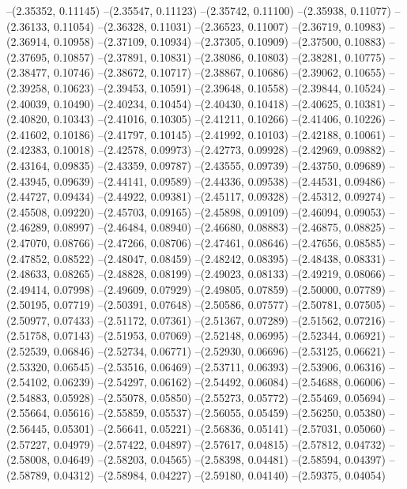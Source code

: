 --(2.35352, 0.11145)
--(2.35547, 0.11123)
--(2.35742, 0.11100)
--(2.35938, 0.11077)
--(2.36133, 0.11054)
--(2.36328, 0.11031)
--(2.36523, 0.11007)
--(2.36719, 0.10983)
--(2.36914, 0.10958)
--(2.37109, 0.10934)
--(2.37305, 0.10909)
--(2.37500, 0.10883)
--(2.37695, 0.10857)
--(2.37891, 0.10831)
--(2.38086, 0.10803)
--(2.38281, 0.10775)
--(2.38477, 0.10746)
--(2.38672, 0.10717)
--(2.38867, 0.10686)
--(2.39062, 0.10655)
--(2.39258, 0.10623)
--(2.39453, 0.10591)
--(2.39648, 0.10558)
--(2.39844, 0.10524)
--(2.40039, 0.10490)
--(2.40234, 0.10454)
--(2.40430, 0.10418)
--(2.40625, 0.10381)
--(2.40820, 0.10343)
--(2.41016, 0.10305)
--(2.41211, 0.10266)
--(2.41406, 0.10226)
--(2.41602, 0.10186)
--(2.41797, 0.10145)
--(2.41992, 0.10103)
--(2.42188, 0.10061)
--(2.42383, 0.10018)
--(2.42578, 0.09973)
--(2.42773, 0.09928)
--(2.42969, 0.09882)
--(2.43164, 0.09835)
--(2.43359, 0.09787)
--(2.43555, 0.09739)
--(2.43750, 0.09689)
--(2.43945, 0.09639)
--(2.44141, 0.09589)
--(2.44336, 0.09538)
--(2.44531, 0.09486)
--(2.44727, 0.09434)
--(2.44922, 0.09381)
--(2.45117, 0.09328)
--(2.45312, 0.09274)
--(2.45508, 0.09220)
--(2.45703, 0.09165)
--(2.45898, 0.09109)
--(2.46094, 0.09053)
--(2.46289, 0.08997)
--(2.46484, 0.08940)
--(2.46680, 0.08883)
--(2.46875, 0.08825)
--(2.47070, 0.08766)
--(2.47266, 0.08706)
--(2.47461, 0.08646)
--(2.47656, 0.08585)
--(2.47852, 0.08522)
--(2.48047, 0.08459)
--(2.48242, 0.08395)
--(2.48438, 0.08331)
--(2.48633, 0.08265)
--(2.48828, 0.08199)
--(2.49023, 0.08133)
--(2.49219, 0.08066)
--(2.49414, 0.07998)
--(2.49609, 0.07929)
--(2.49805, 0.07859)
--(2.50000, 0.07789)
--(2.50195, 0.07719)
--(2.50391, 0.07648)
--(2.50586, 0.07577)
--(2.50781, 0.07505)
--(2.50977, 0.07433)
--(2.51172, 0.07361)
--(2.51367, 0.07289)
--(2.51562, 0.07216)
--(2.51758, 0.07143)
--(2.51953, 0.07069)
--(2.52148, 0.06995)
--(2.52344, 0.06921)
--(2.52539, 0.06846)
--(2.52734, 0.06771)
--(2.52930, 0.06696)
--(2.53125, 0.06621)
--(2.53320, 0.06545)
--(2.53516, 0.06469)
--(2.53711, 0.06393)
--(2.53906, 0.06316)
--(2.54102, 0.06239)
--(2.54297, 0.06162)
--(2.54492, 0.06084)
--(2.54688, 0.06006)
--(2.54883, 0.05928)
--(2.55078, 0.05850)
--(2.55273, 0.05772)
--(2.55469, 0.05694)
--(2.55664, 0.05616)
--(2.55859, 0.05537)
--(2.56055, 0.05459)
--(2.56250, 0.05380)
--(2.56445, 0.05301)
--(2.56641, 0.05221)
--(2.56836, 0.05141)
--(2.57031, 0.05060)
--(2.57227, 0.04979)
--(2.57422, 0.04897)
--(2.57617, 0.04815)
--(2.57812, 0.04732)
--(2.58008, 0.04649)
--(2.58203, 0.04565)
--(2.58398, 0.04481)
--(2.58594, 0.04397)
--(2.58789, 0.04312)
--(2.58984, 0.04227)
--(2.59180, 0.04140)
--(2.59375, 0.04054)

